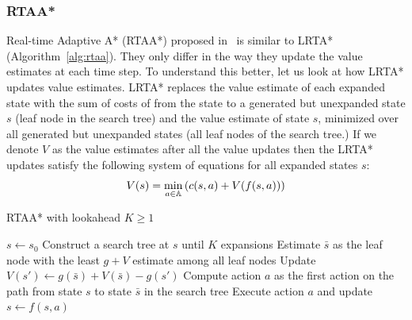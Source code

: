 \subsubsection{RTAA*}
\label{sec:rtaa}

Real-time Adaptive A* (RTAA*) proposed
in~\cite{DBLP:conf/atal/KoenigL06} is similar to LRTA*
(Algorithm~\ref{alg:rtaa}). They only 
differ in the way they update the
value estimates at each time step. To understand this better, let us
look at how LRTA* updates value estimates. LRTA* replaces the value
estimate of each expanded state with the sum of costs of from the
state to a generated but unexpanded state $s$ (leaf node in the search
tree) and the value estimate of state $s$, minimized over all
generated but unexpanded states (all leaf nodes of the search tree.)
If we denote $V$ as the value estimates after all the value
updates then the LRTA* updates satisfy the following system of
equations for all expanded states $s$:
\begin{equation}
  \label{eq:10}
  V(s) = \min_{a \in \mathbb{A}}\left( c(s, a) + V(f(s, a)) \right)
\end{equation}

\begin{algorithm}[t]
  \caption{RTAA* with lookahead $K \geq 1$~\cite{DBLP:conf/atal/KoenigL06}}
  \begin{algorithmic}[1]
    \State $s \leftarrow s_0$
    \State Construct a search tree at $s$ until $K$ expansions
    \State Estimate $\bar{s}$ as the leaf node with the least $g + V$
    estimate among all leaf nodes
    \State Update $V(s') \leftarrow g(\bar{s}) + V(\bar{s}) - g(s')$
    \EndFor
    \State Compute action $a$ as the first action on the path from
    state $s$ to state $\bar{s}$ in the search tree
    \State Execute action $a$ and update $s \leftarrow f(s, a)$
    \EndWhile
  \end{algorithmic}
  \label{alg:rtaa}
\end{algorithm}

